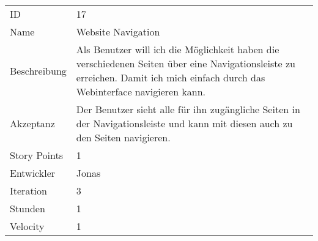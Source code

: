 \begin{table}[htbp]
\begin{minipage}{\linewidth}
\setlength{\tymax}{0.5\linewidth}
\centering
\small
\begin{tabulary}{\textwidth}{|l|p{10cm}|} \toprule
ID   &17\\


Name  &Website Navigation\\
Beschreibung&Als Benutzer will ich die Möglichkeit haben die verschiedenen Seiten über eine Navigationsleiste zu erreichen. Damit ich mich einfach durch das Webinterface navigieren kann.\\
Akzeptanz &Der Benutzer sieht alle für ihn zugängliche Seiten in der Navigationsleiste und kann mit diesen auch zu den Seiten navigieren.\\
Story Points&1\\
Entwickler &Jonas\\
Iteration &3\\
Stunden  &1\\
Velocity &1\\
\bottomrule

\end{tabulary}
\end{minipage}
\end{table}



